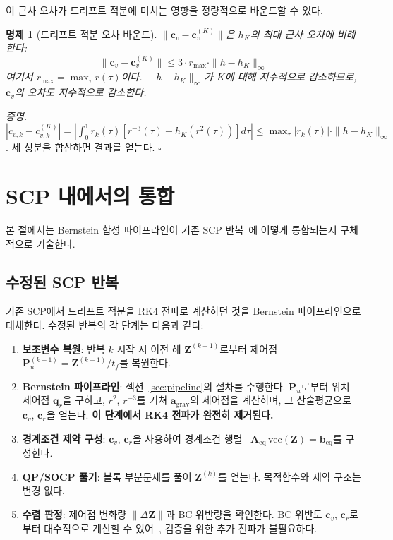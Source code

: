 \documentclass[11pt]{article}
\newtheorem{proposition}{명제}
\begin{document}
이 근사 오차가 드리프트 적분에 미치는 영향을 정량적으로 바운드할 수 있다.

\begin{proposition}[드리프트 적분 오차 바운드]
$\|\mathbf{c}_v - \mathbf{c}_v^{(K)}\|$은 $h_K$의 최대 근사 오차에 비례한다:
\begin{equation}
  \|\mathbf{c}_v - \mathbf{c}_v^{(K)}\| \leq
    3 \cdot r_\mathrm{max} \cdot \|h - h_K\|_\infty
  \label{eq:cv-error-bound}
\end{equation}
여기서 $r_\mathrm{max} = \max_\tau r(\tau)$이다.
$\|h - h_K\|_\infty$가 $K$에 대해 지수적으로 감소하므로,
$\mathbf{c}_v$의 오차도 지수적으로 감소한다.
\end{proposition}

\textit{증명.}\;
$|c_{v,k} - c_{v,k}^{(K)}| = |\int_0^1 r_k(\tau) [r^{-3}(\tau) - h_K(r^2(\tau))] d\tau|
\leq \max_\tau |r_k(\tau)| \cdot \|h - h_K\|_\infty$.
세 성분을 합산하면 결과를 얻는다. \hfill$\square$

\section{SCP 내에서의 통합}
\label{sec:scp}

본 절에서는 Bernstein 합성 파이프라인이 기존 SCP 반복~\cite{report006,report007}에
어떻게 통합되는지 구체적으로 기술한다.

\subsection{수정된 SCP 반복}

기존 SCP에서 드리프트 적분을 RK4 전파로 계산하던 것을
Bernstein 파이프라인으로 대체한다.
수정된 반복의 각 단계는 다음과 같다:

\begin{enumerate}
  \item \textbf{보조변수 복원}: 반복 $k$ 시작 시 이전 해 $\mathbf{Z}^{(k-1)}$로부터
        제어점 $\mathbf{P}_u^{(k-1)} = \mathbf{Z}^{(k-1)} / t_f$를 복원한다.
  \item \textbf{Bernstein 파이프라인}: 섹션~\ref{sec:pipeline}의 절차를 수행한다.
        $\mathbf{P}_u$로부터 위치 제어점 $\mathbf{q}_r$을 구하고,
        $r^2$, $r^{-3}$를 거쳐 $\mathbf{a}_\mathrm{grav}$의 제어점을 계산하며,
        그 산술평균으로 $\mathbf{c}_v$, $\mathbf{c}_r$을 얻는다.
        \textbf{이 단계에서 RK4 전파가 완전히 제거된다.}
  \item \textbf{경계조건 제약 구성}: $\mathbf{c}_v$, $\mathbf{c}_r$을 사용하여
        경계조건 행렬~\cite{report007}
        $\mathbf{A}_\mathrm{eq} \, \mathrm{vec}(\mathbf{Z}) = \mathbf{b}_\mathrm{eq}$를 구성한다.
  \item \textbf{QP/SOCP 풀기}: 볼록 부분문제를 풀어 $\mathbf{Z}^{(k)}$를 얻는다.
        목적함수와 제약 구조는 변경 없다.
  \item \textbf{수렴 판정}: 제어점 변화량 $\|\Delta\mathbf{Z}\|$과
        BC 위반량을 확인한다.
        BC 위반도 $\mathbf{c}_v$, $\mathbf{c}_r$로부터 대수적으로 계산할 수 있어~\cite{report009},
        검증을 위한 추가 전파가 불필요하다.
\end{enumerate}
\end{document}
